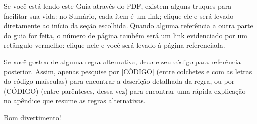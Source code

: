 Se você está lendo este Guia através do PDF, existem alguns truques para facilitar sua vida: no Sumário, cada ítem é um link; clique ele e será levado diretamente ao início da seção escolhida. Quando alguma referência a outra parte do guia for feita, o número de página também será um link evidenciado por um retângulo vermelho: clique nele e você será levado à página referenciada.

Se você gostou de alguma regra alternativa, decore seu código para referência posterior. Assim, apenas pesquise por [CÓDIGO] (entre colchetes e com as letras do código maísculas) para encontrar a descrição detalhada da regra, ou por (CÓDIGO) (entre parênteses, dessa vez) para encontrar uma rápida explicação no apêndice que resume as regras alternativas.

Bom divertimento!